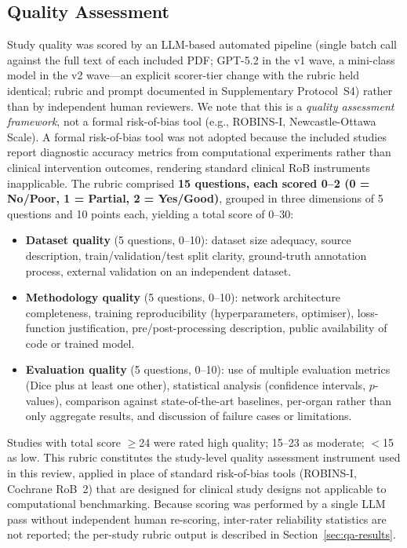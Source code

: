 \subsection{Quality Assessment}

Study quality was scored by an LLM-based automated pipeline (single batch call against the full text of each included PDF; GPT-5.2 in the v1 wave, a mini-class model in the v2 wave---an explicit scorer-tier change with the rubric held identical; rubric and prompt documented in Supplementary Protocol~S4) rather than by independent human reviewers. We note that this is a \emph{quality assessment framework}, not a formal risk-of-bias tool (e.g., ROBINS-I, Newcastle-Ottawa Scale). A formal risk-of-bias tool was not adopted because the included studies report diagnostic accuracy metrics from computational experiments rather than clinical intervention outcomes, rendering standard clinical RoB instruments inapplicable. The rubric comprised \textbf{15 questions, each scored 0--2 (0 = No/Poor, 1 = Partial, 2 = Yes/Good)}, grouped in three dimensions of 5 questions and 10 points each, yielding a total score of 0--30:
\begin{itemize}
    \item \textbf{Dataset quality} (5 questions, 0--10): dataset size adequacy, source description, train/validation/test split clarity, ground-truth annotation process, external validation on an independent dataset.
    \item \textbf{Methodology quality} (5 questions, 0--10): network architecture completeness, training reproducibility (hyperparameters, optimiser), loss-function justification, pre/post-processing description, public availability of code or trained model.
    \item \textbf{Evaluation quality} (5 questions, 0--10): use of multiple evaluation metrics (Dice plus at least one other), statistical analysis (confidence intervals, $p$-values), comparison against state-of-the-art baselines, per-organ rather than only aggregate results, and discussion of failure cases or limitations.
\end{itemize}
Studies with total score $\geq$24 were rated high quality; 15--23 as moderate; $<$15 as low. This rubric constitutes the study-level quality assessment instrument used in this review, applied in place of standard risk-of-bias tools (ROBINS-I, Cochrane RoB~2) that are designed for clinical study designs not applicable to computational benchmarking. Because scoring was performed by a single LLM pass without independent human re-scoring, inter-rater reliability statistics are not reported; the per-study rubric output is described in Section~\ref{sec:qa-results}.

